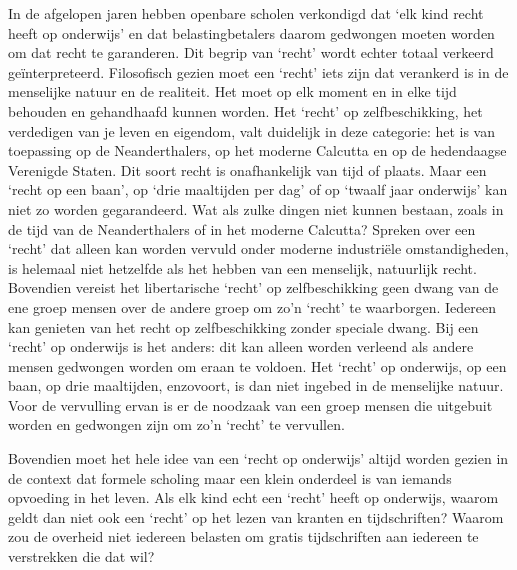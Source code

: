 \documentclass[
  a5paper,
  smalldemyvopaper,10pt,twoside,onecolumn,openright,extrafontsizes,hidelinks]{memoir}
\begin{document}
In de afgelopen jaren hebben openbare scholen verkondigd dat `elk kind
recht heeft op onderwijs' en dat belastingbetalers daarom gedwongen
moeten worden om dat recht te garanderen. Dit begrip van `recht' wordt
echter totaal verkeerd geïnterpreteerd. Filosofisch gezien moet een
`recht' iets zijn dat verankerd is in de menselijke natuur en de
realiteit. Het moet op elk moment en in elke tijd behouden en
gehandhaafd kunnen worden. Het `recht' op zelfbeschikking, het
verdedigen van je leven en eigendom, valt duidelijk in deze categorie:
het is van toepassing op de Neanderthalers, op het moderne Calcutta en
op de hedendaagse Verenigde Staten. Dit soort recht is onafhankelijk van
tijd of plaats. Maar een `recht op een baan', op `drie maaltijden per
dag' of op `twaalf jaar onderwijs' kan niet zo worden gegarandeerd. Wat
als zulke dingen niet kunnen bestaan, zoals in de tijd van de
Neanderthalers of in het moderne Calcutta? Spreken over een `recht' dat
alleen kan worden vervuld onder moderne industriële omstandigheden, is
helemaal niet hetzelfde als het hebben van een menselijk, natuurlijk
recht. Bovendien vereist het libertarische `recht' op zelfbeschikking
geen dwang van de ene groep mensen over de andere groep om zo'n `recht'
te waarborgen. Iedereen kan genieten van het recht op zelfbeschikking
zonder speciale dwang. Bij een `recht' op onderwijs is het anders: dit
kan alleen worden verleend als andere mensen gedwongen worden om eraan
te voldoen. Het `recht' op onderwijs, op een baan, op drie maaltijden,
enzovoort, is dan niet ingebed in de menselijke natuur. Voor de
vervulling ervan is er de noodzaak van een groep mensen die uitgebuit
worden en gedwongen zijn om zo'n `recht' te vervullen.

Bovendien moet het hele idee van een `recht op onderwijs' altijd worden
gezien in de context dat formele scholing maar een klein onderdeel is
van iemands opvoeding in het leven. Als elk kind echt een `recht' heeft
op onderwijs, waarom geldt dan niet ook een `recht' op het lezen van
kranten en tijdschriften? Waarom zou de overheid niet iedereen belasten
om gratis tijdschriften aan iedereen te verstrekken die dat wil?
\end{document}
